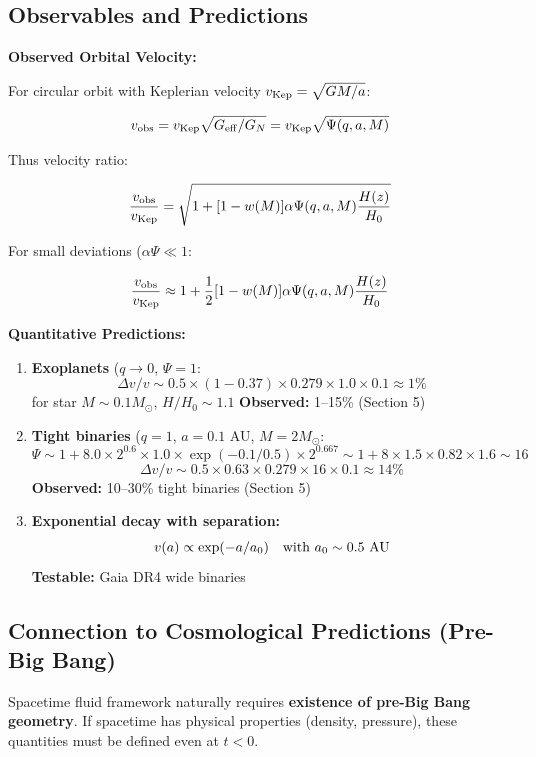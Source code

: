 \documentclass[10pt,a4paper]{article}
\begin{document}
\subsection{Observables and
Predictions}\label{observables-and-predictions}

\textbf{Observed Orbital Velocity:}

For circular orbit with Keplerian velocity
\(v_{\rm Kep} = \sqrt{GM/a}\):

\[v_{\rm obs} = v_{\rm Kep} \sqrt{G_{\rm eff}/G_N} = v_{\rm Kep} \sqrt{\Psi(q,a,M)}\]

Thus velocity ratio:

\[\frac{v_{\rm obs}}{v_{\rm Kep}} = \sqrt{1 + [1-w(M)] \alpha \Psi(q,a,M) \frac{H(z)}{H_0}}\]

For small deviations (\(\alpha \Psi \ll 1\):

\[\frac{v_{\rm obs}}{v_{\rm Kep}} \approx 1 + \frac{1}{2}[1-w(M)] \alpha \Psi(q,a,M) \frac{H(z)}{H_0}\]

\textbf{Quantitative Predictions:}

\begin{enumerate}
\def\labelenumi{\arabic{enumi}.}
\item
  \textbf{Exoplanets} (\(q \to 0\), \(\Psi = 1\):
  \[\Delta v/v \sim 0.5 \times (1-0.37) \times 0.279 \times 1.0 \times 0.1 \approx 1\%\]
  for star \(M \sim 0.1 M_\odot\), \(H/H_0 \sim 1.1\) \textbf{Observed:}
  1--15\% \checkmark{} (Section 5)
\item
  \textbf{Tight binaries} (\(q=1\), \(a=0.1\) AU, \(M=2 M_\odot\):
  \[\Psi \sim 1 + 8.0 \times 2^{0.6} \times 1.0 \times \exp(-0.1/0.5) \times 2^{0.667} \sim 1 + 8 \times 1.5 \times 0.82 \times 1.6 \sim 16\]
  \[\Delta v/v \sim 0.5 \times 0.63 \times 0.279 \times 16 \times 0.1 \approx 14\%\]
  \textbf{Observed:} 10--30\% tight binaries \checkmark{} (Section 5)
\item
  \textbf{Exponential decay with separation:}
  \[v(a) \propto \exp(-a/a_0) \quad \text{with } a_0 \sim 0.5~{\rm AU}\]
  \textbf{Testable:} Gaia DR4 wide binaries \checkmark{}
\end{enumerate}

\subsection{Connection to Cosmological Predictions (Pre-Big
Bang)}\label{connection-to-cosmological-predictions-pre-big-bang}

Spacetime fluid framework naturally requires \textbf{existence of
pre-Big Bang geometry}. If spacetime has physical properties (density,
pressure), these quantities must be defined even at \(t < 0\).
\end{document}
